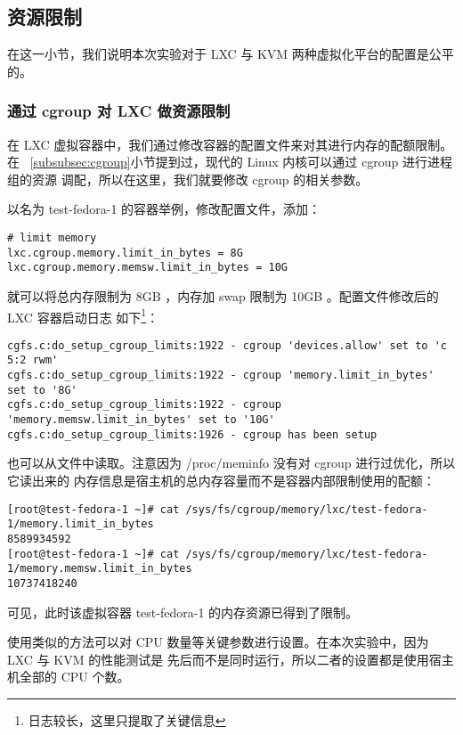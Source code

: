 \subsection{资源限制}

在这一小节，我们说明本次实验对于 LXC 与 KVM 两种虚拟化平台的配置是公平的。

\subsubsection{通过 cgroup 对 LXC 做资源限制}

在 LXC 虚拟容器中，我们通过修改容器的配置文件来对其进行内存的配额限制。在
~\ref{subsubsec:cgroup}小节提到过，现代的 Linux 内核可以通过 cgroup 进行进程组的资源
调配，所以在这里，我们就要修改 cgroup 的相关参数。

以名为 test-fedora-1 的容器举例，修改配置文件，添加：

\begin{lstlisting}
# limit memory
lxc.cgroup.memory.limit_in_bytes = 8G
lxc.cgroup.memory.memsw.limit_in_bytes = 10G
\end{lstlisting}

就可以将总内存限制为 8GB ，内存加 swap 限制为 10GB 。配置文件修改后的 LXC 容器启动日志
如下\footnote{日志较长，这里只提取了关键信息}：

\begin{lstlisting}
cgfs.c:do_setup_cgroup_limits:1922 - cgroup 'devices.allow' set to 'c 5:2 rwm'
cgfs.c:do_setup_cgroup_limits:1922 - cgroup 'memory.limit_in_bytes' set to '8G'
cgfs.c:do_setup_cgroup_limits:1922 - cgroup 'memory.memsw.limit_in_bytes' set to '10G'
cgfs.c:do_setup_cgroup_limits:1926 - cgroup has been setup
\end{lstlisting}

也可以从文件中读取。注意因为 /proc/meminfo 没有对 cgroup 进行过优化，所以它读出来的
内存信息是宿主机的总内存容量而不是容器内部限制使用的配额：

\begin{lstlisting}
[root@test-fedora-1 ~]# cat /sys/fs/cgroup/memory/lxc/test-fedora-1/memory.limit_in_bytes
8589934592
[root@test-fedora-1 ~]# cat /sys/fs/cgroup/memory/lxc/test-fedora-1/memory.memsw.limit_in_bytes
10737418240
\end{lstlisting}

可见，此时该虚拟容器 test-fedora-1 的内存资源已得到了限制。

使用类似的方法可以对 CPU 数量等关键参数进行设置。在本次实验中，因为 LXC 与 KVM 的性能测试是
先后而不是同时运行，所以二者的设置都是使用宿主机全部的 CPU 个数。

